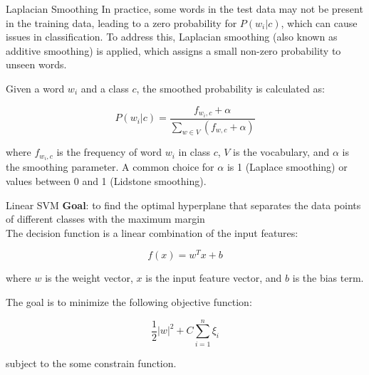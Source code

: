 \documentclass{beamer}
\begin{document}
\begin{frame}{Laplacian Smoothing}
    In practice, some words in the test data may not be present in the training data, leading to a zero probability for $P(w_i|c)$, which can cause issues in classification. To address this, Laplacian smoothing (also known as additive smoothing) is applied, which assigns a small non-zero probability to unseen words.

Given a word $w_i$ and a class $c$, the smoothed probability is calculated as:

\begin{equation}
P(w_i|c) = \frac{f_{w_i, c} + \alpha}{\sum_{w \in V} (f_{w, c} + \alpha)}
\end{equation}

where $f_{w_i, c}$ is the frequency of word $w_i$ in class $c$, $V$ is the vocabulary, and $\alpha$ is the smoothing parameter. A common choice for $\alpha$ is 1 (Laplace smoothing) or values between 0 and 1 (Lidstone smoothing).
\end{frame}
    

\begin{frame}{Linear SVM}
\textbf{Goal}: to find the optimal hyperplane that separates the data points of different classes with the maximum margin
\\
The decision function is a linear combination of the input features:

\begin{equation}
f(x) = w^T x + b
\end{equation}

where $w$ is the weight vector, $x$ is the input feature vector, and $b$ is the bias term.

The goal is to minimize the following objective function:

\begin{equation}
\frac{1}{2} |w|^2 + C \sum_{i=1}^{n} \xi_i
\end{equation}

subject to the some constrain function.
\end{frame}
\end{document}
